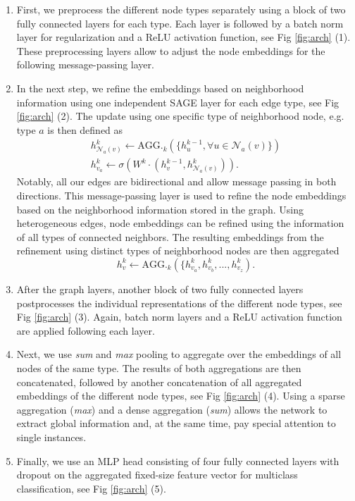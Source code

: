 \begin{enumerate}
    \item First, we preprocess the different node types separately using a block of two fully connected layers for each type. Each layer is followed by a batch norm layer for regularization and a ReLU activation function, see Fig \ref{fig:arch} (1). These preprocessing layers allow to adjust the node embeddings for the following message-passing layer. 
    \item In the next step, we refine the embeddings based on neighborhood information using one independent SAGE \cite{hamilton2017inductive} layer for each edge type, see Fig \ref{fig:arch} (2). The update using one specific type of neighborhood node, e.g. type $a$ is then defined as
    \begin{gather}
          h_{\mathcal{N}_a(v)}^k\leftarrow\mathrm{AGG.}_k(\{h_u^{k-1},\forall u\in\mathcal{N}_a(v)\}) \\
          h^k_{v_a}\leftarrow\sigma\left(W^k\cdot(h_v^{k-1},h_{\mathcal{N}_a(v)}^k)\right) .
    \end{gather}
    Notably, all our edges are bidirectional and allow message passing in both directions. This message-passing layer is used to refine the node embeddings based on the neighborhood information stored in the graph. Using heterogeneous edges, node embeddings can be refined using the information of all types of connected neighbors. The resulting embeddings from the refinement using distinct types of neighborhood nodes are then aggregated 
    \begin{equation}
          h^k_v\leftarrow\mathrm{AGG.}_k(\{h^k_{v_a}, h^k_{v_b}, ..., h^k_{v_z}).
    \end{equation}
    \item After the graph layers, another block of two fully connected layers postprocesses the individual representations of the different node types, see Fig \ref{fig:arch} (3). Again, batch norm layers and a ReLU activation function are applied following each layer. 
    \item Next, we use \textit{sum} and \textit{max} pooling to aggregate over the embeddings of all nodes of the same type. The results of both aggregations are then concatenated, followed by another concatenation of all aggregated embeddings of the different node types, see Fig \ref{fig:arch} (4). Using a sparse aggregation (\textit{max}) and a dense aggregation (\textit{sum}) allows the network to extract global information and, at the same time, pay special attention to single instances. 
    \item Finally, we use an MLP head consisting of four fully connected layers with dropout on the aggregated fixed-size feature vector for multiclass classification, see Fig \ref{fig:arch} (5). 
\end{enumerate}

